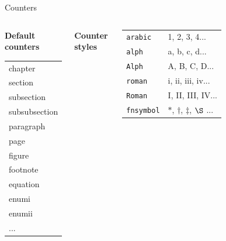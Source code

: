 \documentclass[11pt]{beamer}
\begin{document}
\begin{frame}{Counters}
  
  \begin{columns}
    
    \begin{center}
      {\large\textbf{Default counters}}
  
      \vspace{0.3cm}
      \begin{tabular}{l}
        chapter \\
        section \\
        subsection \\
        subsubsection \\
        paragraph \\
        page \\
        figure \\
        footnote \\
        equation \\
        enumi \\
        enumii \\
        ...
      \end{tabular}
    \end{center}

    {\large\textbf{Counter styles}}

    \vspace{0.3cm}
    \begin{tabular}{ll}
      \texttt{arabic} & 1, 2, 3, 4... \\
      \texttt{alph}   & a, b, c, d... \\
      \texttt{Alph}   & A, B, C, D... \\
      \texttt{roman}  & i, ii, iii, iv... \\
      \texttt{Roman}  & I, II, III, IV... \\
      \texttt{fnsymbol} & $\ast$, $\dagger$, $\ddagger$, $\S$ ...
    \end{tabular}
  \end{columns}
\end{frame}
\end{document}
